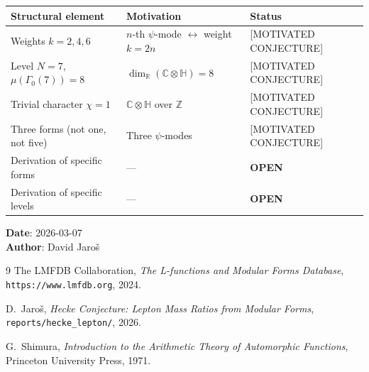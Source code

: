 \documentclass[12pt]{article}
\theoremstyle{definition}
\theoremstyle{remark}
\begin{document}
\begin{center}
\renewcommand{\arraystretch}{1.3}
\begin{tabular}{llp{5cm}}
\toprule
\textbf{Structural element} & \textbf{Motivation} & \textbf{Status} \\
\midrule
Weights $k = 2, 4, 6$ & $n$-th $\psi$-mode $\leftrightarrow$ weight $k=2n$ &
  [MOTIVATED CONJECTURE] \\
Level $N = 7$, $\mu(\Gamma_0(7)) = 8$ & $\dim_{\mathbb{R}}(\mathbb{C}\otimes\mathbb{H})=8$ &
  [MOTIVATED CONJECTURE] \\
Trivial character $\chi = 1$ & $\mathbb{C}\otimes\mathbb{H}$ over $\mathbb{Z}$ &
  [MOTIVATED CONJECTURE] \\
Three forms (not one, not five) & Three $\psi$-modes &
  [MOTIVATED CONJECTURE] \\
Derivation of specific forms & — &
  \textbf{OPEN} \\
Derivation of specific levels & — &
  \textbf{OPEN} \\
\bottomrule
\end{tabular}
\end{center}

\noindent\textbf{Date}: 2026-03-07 \\
\textbf{Author}: David Jaroš

\begin{thebibliography}{9}
The LMFDB Collaboration, \textit{The L-functions and Modular Forms Database},
\texttt{https://www.lmfdb.org}, 2024.

D.\ Jaroš, \textit{Hecke Conjecture: Lepton Mass Ratios from Modular Forms},
\texttt{reports/hecke\_lepton/}, 2026.

G.\ Shimura, \textit{Introduction to the Arithmetic Theory of Automorphic Functions},
Princeton University Press, 1971.
\end{thebibliography}

\ifdefined\INCLUDEMODE
\else
\end{document}
